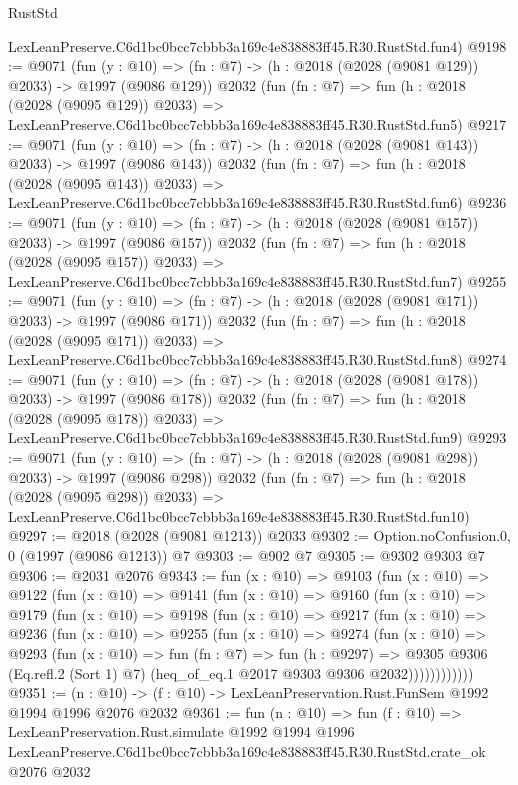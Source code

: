 \begin{lexlean}{RustStd}
\begin{coremodule}
    LexLeanPreserve.C6d1bc0bcc7cbbb3a169c4e838883ff45.R30.RustStd.fun4)
@9198 := @9071
    (fun (y : @10) => (fn : @7) -> (h : @2018 (@2028 (@9081 @129)) @2033) -> @1997 (@9086 @129))
    @2032
    (fun (fn : @7) =>
    fun (h : @2018 (@2028 (@9095 @129)) @2033) =>
    LexLeanPreserve.C6d1bc0bcc7cbbb3a169c4e838883ff45.R30.RustStd.fun5)
@9217 := @9071
    (fun (y : @10) => (fn : @7) -> (h : @2018 (@2028 (@9081 @143)) @2033) -> @1997 (@9086 @143))
    @2032
    (fun (fn : @7) =>
    fun (h : @2018 (@2028 (@9095 @143)) @2033) =>
    LexLeanPreserve.C6d1bc0bcc7cbbb3a169c4e838883ff45.R30.RustStd.fun6)
@9236 := @9071
    (fun (y : @10) => (fn : @7) -> (h : @2018 (@2028 (@9081 @157)) @2033) -> @1997 (@9086 @157))
    @2032
    (fun (fn : @7) =>
    fun (h : @2018 (@2028 (@9095 @157)) @2033) =>
    LexLeanPreserve.C6d1bc0bcc7cbbb3a169c4e838883ff45.R30.RustStd.fun7)
@9255 := @9071
    (fun (y : @10) => (fn : @7) -> (h : @2018 (@2028 (@9081 @171)) @2033) -> @1997 (@9086 @171))
    @2032
    (fun (fn : @7) =>
    fun (h : @2018 (@2028 (@9095 @171)) @2033) =>
    LexLeanPreserve.C6d1bc0bcc7cbbb3a169c4e838883ff45.R30.RustStd.fun8)
@9274 := @9071
    (fun (y : @10) => (fn : @7) -> (h : @2018 (@2028 (@9081 @178)) @2033) -> @1997 (@9086 @178))
    @2032
    (fun (fn : @7) =>
    fun (h : @2018 (@2028 (@9095 @178)) @2033) =>
    LexLeanPreserve.C6d1bc0bcc7cbbb3a169c4e838883ff45.R30.RustStd.fun9)
@9293 := @9071
    (fun (y : @10) => (fn : @7) -> (h : @2018 (@2028 (@9081 @298)) @2033) -> @1997 (@9086 @298))
    @2032
    (fun (fn : @7) =>
    fun (h : @2018 (@2028 (@9095 @298)) @2033) =>
    LexLeanPreserve.C6d1bc0bcc7cbbb3a169c4e838883ff45.R30.RustStd.fun10)
@9297 := @2018 (@2028 (@9081 @1213)) @2033
@9302 := Option.noConfusion.{0, 0} (@1997 (@9086 @1213)) @7
@9303 := @902 @7
@9305 := @9302 @9303 @7
@9306 := @2031 @2076
@9343 := fun (x : @10) =>
  @9103
    (fun (x : @10) =>
    @9122
      (fun (x : @10) =>
      @9141
        (fun (x : @10) =>
        @9160
          (fun (x : @10) =>
          @9179
            (fun (x : @10) =>
            @9198
              (fun (x : @10) =>
              @9217
                (fun (x : @10) =>
                @9236
                  (fun (x : @10) =>
                  @9255
                    (fun (x : @10) =>
                    @9274
                      (fun (x : @10) =>
                      @9293
                        (fun (x : @10) =>
                        fun (fn : @7) =>
                        fun (h : @9297) =>
                        @9305
                          @9306
                          (Eq.refl.{2} (Sort 1) @7)
                          (heq_of_eq.{1} @2017 @9303 @9306 @2032))))))))))))
@9351 := (n : @10) -> (f : @10) -> LexLeanPreservation.Rust.FunSem @1992 @1994 @1996 @2076 @2032
@9361 := fun (n : @10) =>
  fun (f : @10) =>
  LexLeanPreservation.Rust.simulate
    @1992
    @1994
    @1996
    LexLeanPreserve.C6d1bc0bcc7cbbb3a169c4e838883ff45.R30.RustStd.crate_ok
    @2076
    @2032
\end{coremodule}
\end{lexlean}
